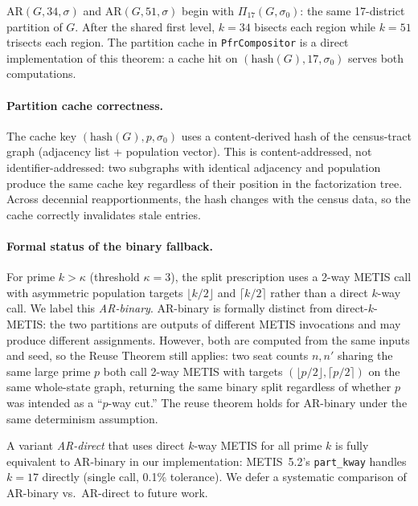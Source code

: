 \begin{corollary}
  $\text{AR}(G, 34, \sigma)$ and $\text{AR}(G, 51, \sigma)$ begin with
  $\Pi_{17}(G, \sigma_0)$: the same 17-district partition of $G$.
  After the shared first level, $k=34$ bisects each region while
  $k=51$ trisects each region. The partition cache in \texttt{PfrCompositor}
  is a direct implementation of this theorem: a cache hit on
  $(\text{hash}(G), 17, \sigma_0)$ serves both computations.
\end{corollary}

\paragraph{Partition cache correctness.}
The cache key $(\text{hash}(G), p, \sigma_0)$ uses a content-derived hash
of the census-tract graph (adjacency list + population vector). This is
content-addressed, not identifier-addressed: two subgraphs with identical
adjacency and population produce the same cache key regardless of their
position in the factorization tree. Across decennial reapportionments,
the hash changes with the census data, so the cache correctly invalidates
stale entries.

\paragraph{Formal status of the binary fallback.}
For prime $k > \kappa$ (threshold $\kappa = 3$), the split prescription uses
a 2-way METIS call with asymmetric population targets $\lfloor k/2 \rfloor$
and $\lceil k/2 \rceil$ rather than a direct $k$-way call. We label this
\emph{AR-binary}. AR-binary is formally distinct from direct-$k$-METIS:
the two partitions are outputs of different METIS invocations and may produce
different assignments. However, both are computed from the same inputs and
seed, so the Reuse Theorem still applies: two seat counts $n, n'$ sharing the
same large prime $p$ both call 2-way METIS with targets $(\lfloor p/2 \rfloor,
\lceil p/2 \rceil)$ on the same whole-state graph, returning the same binary
split regardless of whether $p$ was intended as a ``$p$-way cut.'' The reuse
theorem holds for AR-binary under the same determinism assumption.

A variant \emph{AR-direct} that uses direct $k$-way METIS for all prime $k$
is fully equivalent to AR-binary in our implementation: METIS~5.2's
\texttt{part\_kway} handles $k = 17$ directly (single call, 0.1\% tolerance).
We defer a systematic comparison of AR-binary vs.\ AR-direct to future work.

